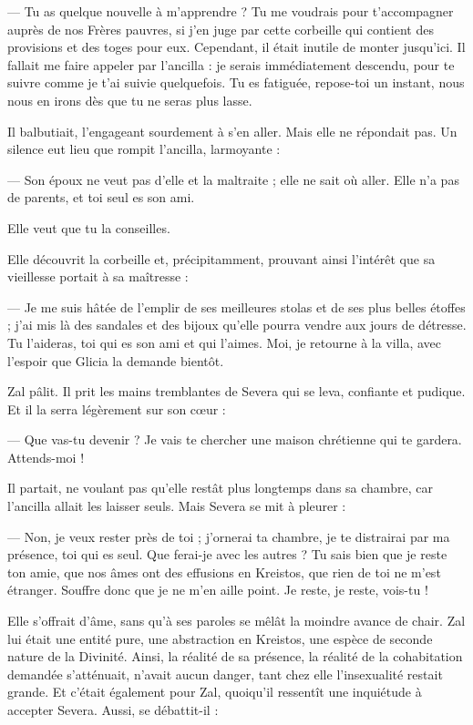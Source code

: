 \documentclass[a4paper, 11pt, oneside, polutonikogreek, french]{article}
\begin{document}
--- Tu as quelque nouvelle à m'apprendre ? Tu me voudrais pour t'accompagner auprès de nos Frères pauvres, si j'en juge par cette corbeille qui contient des provisions et des toges pour eux. Cependant, il était inutile de monter jusqu'ici. Il fallait me faire appeler par l'ancilla : je serais immédiatement descendu, pour te suivre comme je t'ai suivie quelquefois. Tu es fatiguée, repose-toi un instant, nous nous en irons dès que tu ne seras plus lasse.

Il balbutiait, l'engageant sourdement à s'en aller. Mais elle ne répondait pas. Un silence eut lieu que rompit l'ancilla, larmoyante :

--- Son époux ne veut pas d'elle et la maltraite ; elle ne sait où aller. Elle n'a pas de parents, et toi seul es son ami.

Elle veut que tu la conseilles.

Elle découvrit la corbeille et, précipitamment, prouvant ainsi l'intérêt que sa vieillesse portait à sa maîtresse :

--- Je me suis hâtée de l'emplir de ses meilleures stolas et de ses plus belles étoffes ; j'ai mis là des sandales et des bijoux qu'elle pourra vendre aux jours de détresse. Tu l'aideras, toi qui es son ami et qui l'aimes. Moi, je retourne à la villa, avec l'espoir que Glicia la demande bientôt.

Zal pâlit. Il prit les mains tremblantes de Severa qui se leva, confiante et pudique. Et il la serra légèrement sur son cœur :

--- Que vas-tu devenir ? Je vais te chercher une maison chrétienne qui te gardera. Attends-moi !

Il partait, ne voulant pas qu'elle restât plus longtemps dans sa chambre, car l'ancilla allait les laisser seuls. Mais Severa se mit à pleurer :

--- Non, je veux rester près de toi ; j'ornerai ta chambre, je te distrairai par ma présence, toi qui es seul. Que ferai-je avec les autres ? Tu sais bien que je reste ton amie, que nos âmes ont des effusions en Kreistos, que rien de toi ne m'est étranger. Souffre donc que je ne m'en aille point. Je reste, je reste, vois-tu !

Elle s'offrait d'âme, sans qu'à ses paroles se mêlât la moindre avance de chair. Zal lui était une entité pure, une abstraction en Kreistos, une espèce de seconde nature de la Divinité. Ainsi, la réalité de sa présence, la réalité de la cohabitation demandée s'atténuait, n'avait aucun danger, tant chez elle l'insexualité restait grande. Et c'était également pour Zal, quoiqu'il ressentît une inquiétude à accepter Severa. Aussi, se débattit-il :
\end{document}

